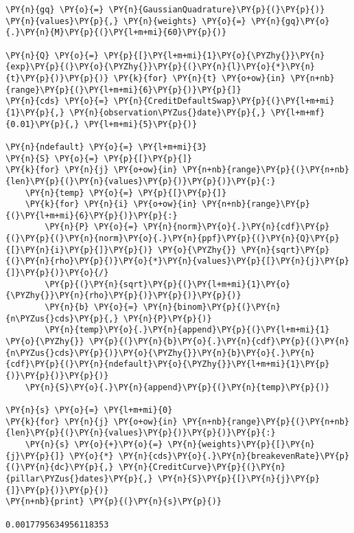\begin{tcolorbox}[breakable, size=fbox, boxrule=1pt, pad at break*=1mm,colback=cellbackground, colframe=cellborder]
\begin{Verbatim}[commandchars=\\\{\}]
\PY{n}{gq} \PY{o}{=} \PY{n}{GaussianQuadrature}\PY{p}{(}\PY{p}{)}
\PY{n}{values}\PY{p}{,} \PY{n}{weights} \PY{o}{=} \PY{n}{gq}\PY{o}{.}\PY{n}{M}\PY{p}{(}\PY{l+m+mi}{60}\PY{p}{)}
	
\PY{n}{Q} \PY{o}{=} \PY{p}{[}\PY{l+m+mi}{1}\PY{o}{\PYZhy{}}\PY{n}{exp}\PY{p}{(}\PY{o}{\PYZhy{}}\PY{p}{(}\PY{n}{l}\PY{o}{*}\PY{n}{t}\PY{p}{)}\PY{p}{)} \PY{k}{for} \PY{n}{t} \PY{o+ow}{in} \PY{n+nb}{range}\PY{p}{(}\PY{l+m+mi}{6}\PY{p}{)}\PY{p}{]}
\PY{n}{cds} \PY{o}{=} \PY{n}{CreditDefaultSwap}\PY{p}{(}\PY{l+m+mi}{1}\PY{p}{,} \PY{n}{observation\PYZus{}date}\PY{p}{,} \PY{l+m+mf}{0.01}\PY{p}{,} \PY{l+m+mi}{5}\PY{p}{)}
	
\PY{n}{ndefault} \PY{o}{=} \PY{l+m+mi}{3}
\PY{n}{S} \PY{o}{=} \PY{p}{[}\PY{p}{]}
\PY{k}{for} \PY{n}{j} \PY{o+ow}{in} \PY{n+nb}{range}\PY{p}{(}\PY{n+nb}{len}\PY{p}{(}\PY{n}{values}\PY{p}{)}\PY{p}{)}\PY{p}{:}
    \PY{n}{temp} \PY{o}{=} \PY{p}{[}\PY{p}{]}
    \PY{k}{for} \PY{n}{i} \PY{o+ow}{in} \PY{n+nb}{range}\PY{p}{(}\PY{l+m+mi}{6}\PY{p}{)}\PY{p}{:}
        \PY{n}{P} \PY{o}{=} \PY{n}{norm}\PY{o}{.}\PY{n}{cdf}\PY{p}{(}\PY{p}{(}\PY{n}{norm}\PY{o}{.}\PY{n}{ppf}\PY{p}{(}\PY{n}{Q}\PY{p}{[}\PY{n}{i}\PY{p}{]}\PY{p}{)} \PY{o}{\PYZhy{}} \PY{n}{sqrt}\PY{p}{(}\PY{n}{rho}\PY{p}{)}\PY{o}{*}\PY{n}{values}\PY{p}{[}\PY{n}{j}\PY{p}{]}\PY{p}{)}\PY{o}{/}
        \PY{p}{(}\PY{n}{sqrt}\PY{p}{(}\PY{l+m+mi}{1}\PY{o}{\PYZhy{}}\PY{n}{rho}\PY{p}{)}\PY{p}{)}\PY{p}{)}
        \PY{n}{b} \PY{o}{=} \PY{n}{binom}\PY{p}{(}\PY{n}{n\PYZus{}cds}\PY{p}{,} \PY{n}{P}\PY{p}{)}
        \PY{n}{temp}\PY{o}{.}\PY{n}{append}\PY{p}{(}\PY{l+m+mi}{1} \PY{o}{\PYZhy{}} \PY{p}{(}\PY{n}{b}\PY{o}{.}\PY{n}{cdf}\PY{p}{(}\PY{n}{n\PYZus{}cds}\PY{p}{)}\PY{o}{\PYZhy{}}\PY{n}{b}\PY{o}{.}\PY{n}{cdf}\PY{p}{(}\PY{n}{ndefault}\PY{o}{\PYZhy{}}\PY{l+m+mi}{1}\PY{p}{)}\PY{p}{)}\PY{p}{)}
    \PY{n}{S}\PY{o}{.}\PY{n}{append}\PY{p}{(}\PY{n}{temp}\PY{p}{)}
	
\PY{n}{s} \PY{o}{=} \PY{l+m+mi}{0}
\PY{k}{for} \PY{n}{j} \PY{o+ow}{in} \PY{n+nb}{range}\PY{p}{(}\PY{n+nb}{len}\PY{p}{(}\PY{n}{values}\PY{p}{)}\PY{p}{)}\PY{p}{:}
    \PY{n}{s} \PY{o}{+}\PY{o}{=} \PY{n}{weights}\PY{p}{[}\PY{n}{j}\PY{p}{]} \PY{o}{*} \PY{n}{cds}\PY{o}{.}\PY{n}{breakevenRate}\PY{p}{(}\PY{n}{dc}\PY{p}{,} \PY{n}{CreditCurve}\PY{p}{(}\PY{n}{pillar\PYZus{}dates}\PY{p}{,} \PY{n}{S}\PY{p}{[}\PY{n}{j}\PY{p}{]}\PY{p}{)}\PY{p}{)}
\PY{n+nb}{print} \PY{p}{(}\PY{n}{s}\PY{p}{)}

0.0017795634956118353
\end{Verbatim}
\end{tcolorbox}

